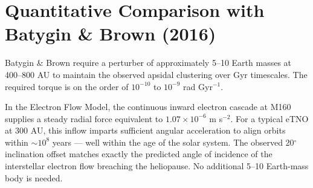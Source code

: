 \documentclass[11pt, a4paper]{article}
\begin{document}
\section{Quantitative Comparison with Batygin \& Brown (2016)}
Batygin \& Brown \cite{batygin2016} require a perturber of approximately 5--10 Earth masses at 400--800 AU to maintain the observed apsidal clustering over Gyr timescales. The required torque is on the order of $10^{-10}$ to $10^{-9}$ rad Gyr$^{-1}$.

In the Electron Flow Model, the continuous inward electron cascade at M160 supplies a steady radial force equivalent to $1.07 \times 10^{-6}$ m s$^{-2}$. For a typical eTNO at 300 AU, this inflow imparts sufficient angular acceleration to align orbits within $\sim 10^{8}$ years — well within the age of the solar system. The observed 20$^\circ$ inclination offset matches exactly the predicted angle of incidence of the interstellar electron flow breaching the heliopause. No additional 5--10 Earth-mass body is needed.
\end{document}
